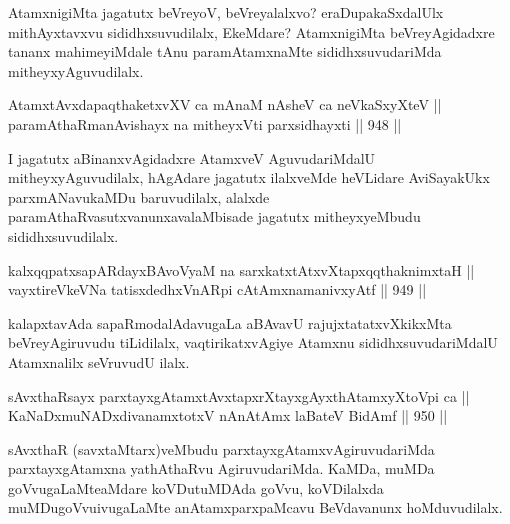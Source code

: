 \begin{artha}
AtamxnigiMta jagatutx beVreyoV, beVreyalalxvo? eraDupakaSxdalUlx mithAyxtavxvu sididhxsuvudilalx, EkeMdare? AtamxnigiMta beVreyAgidadxre tananx mahimeyiMdale tAnu paramAtamxnaMte sididhxsuvudariMda mitheyxyAguvudilalx.
\end{artha}


\begin{shl}
AtamxtAvxdapaqthaketxvXV ca mAnaM nAsheV ca neVkaSxyXteV || \\
paramAthaRmanAvishayx na mitheyxVti parxsidhayxti \hfill || 948 ||  
\end{shl}

\begin{artha}
I jagatutx aBinanxvAgidadxre AtamxveV AguvudariMdalU mitheyxyAguvudilalx, hAgAdare jagatutx ilalxveMde heVLidare AviSayakUkx parxmANavukaMDu baruvudilalx, alalxde paramAthaRvasutxvanunx\break avalaMbisade jagatutx mitheyxyeMbudu sididhxsuvudilalx.
\end{artha}


\begin{shl}
kalxqqpatxsapARdayxBAvoV\s yaM na sarxkatxtAtxvXtapxqqthaknimxtaH || \\
vayxtireVkeVNa tatisxdedhxVnARpi cA\s \s tAmxnamanivxyAtf \hfill || 949 ||  
\end{shl}

\begin{artha}
kalapxtavAda sapaRmodalAdavugaLa aBAvavU rajujxtatatxvXkikxMta beVreyAgiruvudu tiLidilalx, vaqtirikatxvAgiye Atamxnu sididhxsuvudariMdalU Atamxnalilx seVruvudU ilalx.
\end{artha}


\begin{shl}
sAvxthaRsayx parxtayxgAtamxtAvxtapxrXtayxgAyxthAtamxyXtoV\s pi ca || \\
KaNaDxmuNADxdivanamxtotxV nAnAtAmx laBateV BidAmf \hfill || 950 ||  
\end{shl}

\begin{artha}
sAvxthaR (savxtaMtarx)veMbudu parxtayxgAtamxvAgiruvudariMda parxtayxgAtamxna yathAthaRvu AgiruvudariMda. KaMDa, muMDa goVvugaLaMte\break aMdare koVDutuMDAda goVvu, koVDilalxda muMDugoVvu\break ivugaLaMte anAtamxparxpaMcavu BeVdavanunx hoMduvudilalx.
\end{artha}

